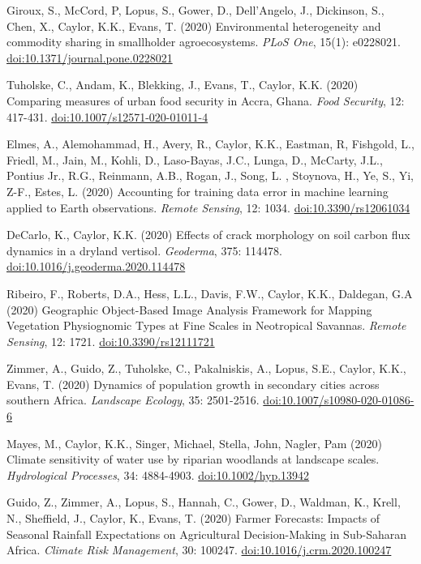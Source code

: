 \begin{etaremune}
\item Giroux, S., McCord, P, Lopus, S., Gower, D., Dell'Angelo, J., Dickinson, S., Chen, X., Caylor, K.K., Evans, T. (2020) Environmental heterogeneity and commodity sharing in smallholder agroecosystems. \emph{PLoS One}, 15(1): e0228021. \href{https://doi.org/10.1371/journal.pone.0228021}{doi:10.1371/journal.pone.0228021}
\item Tuholske, C., Andam, K., Blekking, J., Evans, T., Caylor, K.K. (2020) Comparing measures of urban food security in Accra, Ghana. \emph{Food Security}, 12: 417-431. \href{https://doi.org/10.1007/s12571-020-01011-4}{doi:10.1007/s12571-020-01011-4}
\item Elmes, A., Alemohammad, H., Avery, R., Caylor, K.K., Eastman, R, Fishgold, L., Friedl, M., Jain, M., Kohli, D., Laso-Bayas, J.C., Lunga, D., McCarty, J.L., Pontius Jr., R.G., Reinmann, A.B., Rogan, J., Song, L. , Stoynova, H., Ye, S., Yi, Z-F., Estes, L. (2020) Accounting for training data error in machine learning applied to 
Earth observations. \emph{Remote Sensing}, 12: 1034. \href{https://doi.org/10.3390/rs12061034}{doi:10.3390/rs12061034}
\item DeCarlo, K., Caylor, K.K. (2020) Effects of crack morphology on soil carbon flux dynamics in a dryland vertisol. \emph{Geoderma}, 375: 114478. \href{https://doi.org/10.1016/j.geoderma.2020.114478}{doi:10.1016/j.geoderma.2020.114478}
\item Ribeiro, F., Roberts, D.A., Hess, L.L., Davis, F.W., Caylor, K.K., Daldegan, G.A (2020) Geographic Object-Based Image Analysis Framework for Mapping Vegetation Physiognomic Types at Fine Scales in Neotropical Savannas. \emph{Remote Sensing}, 12: 1721. \href{https://doi.org/10.3390/rs12111721}{doi:10.3390/rs12111721}
\item Zimmer, A., Guido, Z., Tuholske, C., Pakalniskis, A., Lopus, S.E., Caylor, K.K., Evans, T. (2020) Dynamics of population growth in secondary cities across southern Africa. \emph{Landscape Ecology}, 35: 2501-2516. \href{https://doi.org/10.1007/s10980-020-01086-6}{doi:10.1007/s10980-020-01086-6}
\item Mayes, M., Caylor, K.K., Singer, Michael, Stella, John, Nagler, Pam (2020) Climate sensitivity of water use by riparian woodlands at landscape scales. \emph{Hydrological Processes}, 34: 4884-4903. \href{https://doi.org/10.1002/hyp.13942}{doi:10.1002/hyp.13942}
\item Guido, Z., Zimmer, A., Lopus, S., Hannah, C., Gower, D., Waldman, K., Krell, N., Sheffield, J., Caylor, K., Evans, T. (2020) Farmer Forecasts: Impacts of Seasonal Rainfall Expectations on Agricultural Decision-Making in Sub-Saharan Africa. \emph{Climate Risk Management}, 30: 100247. \href{https://doi.org/10.1016/j.crm.2020.100247}{doi:10.1016/j.crm.2020.100247}


\end{etaremune}
